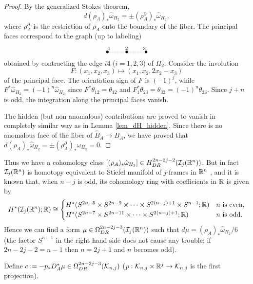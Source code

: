 \begin{proof}
By the generalized Stokes theorem,
\[
 d(\rho_A )_* \hat{\omega}_{H_2} = \pm (\rho^{\partial}_A )_* \hat{\omega}_{H_2},
\]
where $\rho^{\partial}_A$ is the restriction of $\rho_A$ onto the boundary of the fiber.
The principal faces correspond to the graph (up to labeling)
\[%
 \begin{xy}
 (0,0)*{\bullet}="A", (10,0)*{\bullet}="B", (20,0)*{\bullet}="C",
 {\ar@{.}"A";"B"^<{1}},{\ar@{.}"B";"C"^>{3}},
 (10,2)*{\sb 2}
 \end{xy}
\]
obtained by contracting the edge $i4$ ($i=1,2,3$) of $H_2$.
Consider the involution
\[
 F : (x_1 ,x_2 ,x_3 ) \longmapsto (x_1 ,x_2 ,2x_2 -x_3)
\]
of the principal face.
The orientation sign of $F$ is $(-1)^j$, while $F^* \hat{\omega}_{H_2}=(-1)^n \hat{\omega}_{H_2}$
since $F^* \theta_{12} = \theta_{12}$ and $F^*_1 \theta_{23} = \theta_{32}=(-1)^n \theta_{23}$.
Since $j+n$ is odd, the integration along the principal faces vanish.


The hidden (but non-anomalous) contributions are proved to vanish in completely similar way as in
Lemma \ref{lem_dH_hidden}.
Since there is no anomalous face of the fiber of $\hat{B}_A \to B_A$, we have proved that
$d(\rho_A )_* \hat{\omega}_{H_2} = \pm (\rho^{\partial}_A )_* \hat{\omega}_{H_2}=0$.
\end{proof}


Thus we have a cohomology class $[(\rho_A )_* \hat{\omega}_{H_2}] \in H^{2n-2j-2}_{DR}(\mathcal{I}_j (\mathbb{R}^n ))$.
But in fact $\mathcal{I}_j (\mathbb{R}^n )$ is homotopy equivalent to Stiefel manifold of $j$-frames in $\mathbb{R}^n$ \cite{Rossi_thesis}, and
it is known that, when $n-j$ is odd, its cohomology ring with coefficients in $\mathbb{R}$ is given by
\[
 H^* (\mathcal{I}_j (\mathbb{R}^n );\mathbb{R} ) \cong
 \begin{cases}
  H^* (S^{2n-5}\times S^{2n-9} \times \dots \times S^{2(n-j)+1} \times S^{n-1};\mathbb{R} ) & n \text{ is even}, \\
  H^* (S^{2n-7}\times S^{2n-11} \times \dots \times S^{2(n-j)+1};\mathbb{R} ) & n \text{ is odd}.
 \end{cases}
\]
Hence we can find a form $\mu \in \Omega^{2n-2j-3}_{DR}(\mathcal{I}_j (\mathbb{R}^n ))$ such that $d\mu =(\rho_A )_* \hat{\omega}_{H_2}/6$
(the factor $S^{n-1}$ in the right hand side does not cause any trouble; if $2n-2j-2=n-1$ then $n=2j+1$ and $n$ becomes
odd).


\begin{defn}\label{def_c}
Define $c:=-p_* D^*_A \mu \in \Omega^{2n-3j-3}_{DR}(\mathcal{K}_{n ,j})$ ($p:\mathcal{K}_{n ,j} \times \mathbb{R}^j \to \mathcal{K}_{n ,j}$ is the first
projection).
\end{defn}


